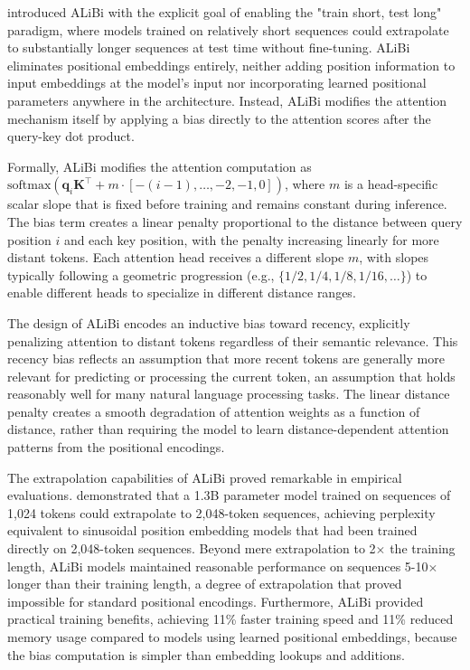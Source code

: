 \citet{press2022train} introduced ALiBi with the explicit goal of enabling the "train short, test long" paradigm, where models trained on relatively short sequences could extrapolate to substantially longer sequences at test time without fine-tuning. ALiBi eliminates positional embeddings entirely, neither adding position information to input embeddings at the model's input nor incorporating learned positional parameters anywhere in the architecture. Instead, ALiBi modifies the attention mechanism itself by applying a bias directly to the attention scores after the query-key dot product.

Formally, ALiBi modifies the attention computation as $\text{softmax}(\mathbf{q}_i \mathbf{K}^\top + m \cdot [-(i-1), \ldots, -2, -1, 0])$, where $m$ is a head-specific scalar slope that is fixed before training and remains constant during inference. The bias term creates a linear penalty proportional to the distance between query position $i$ and each key position, with the penalty increasing linearly for more distant tokens. Each attention head receives a different slope $m$, with slopes typically following a geometric progression (e.g., $\{1/2, 1/4, 1/8, 1/16, \ldots\}$) to enable different heads to specialize in different distance ranges.

The design of ALiBi encodes an inductive bias toward recency, explicitly penalizing attention to distant tokens regardless of their semantic relevance. This recency bias reflects an assumption that more recent tokens are generally more relevant for predicting or processing the current token, an assumption that holds reasonably well for many natural language processing tasks. The linear distance penalty creates a smooth degradation of attention weights as a function of distance, rather than requiring the model to learn distance-dependent attention patterns from the positional encodings.

The extrapolation capabilities of ALiBi proved remarkable in empirical evaluations. \citet{press2022train} demonstrated that a 1.3B parameter model trained on sequences of 1,024 tokens could extrapolate to 2,048-token sequences, achieving perplexity equivalent to sinusoidal position embedding models that had been trained directly on 2,048-token sequences. Beyond mere extrapolation to 2$\times$ the training length, ALiBi models maintained reasonable performance on sequences 5-10$\times$ longer than their training length, a degree of extrapolation that proved impossible for standard positional encodings. Furthermore, ALiBi provided practical training benefits, achieving 11\% faster training speed and 11\% reduced memory usage compared to models using learned positional embeddings, because the bias computation is simpler than embedding lookups and additions.

